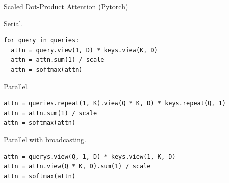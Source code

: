 \documentclass{beamer}
\begin{document}
\begin{frame}[fragile]{Scaled Dot-Product Attention (Pytorch)}

Serial.

\begin{verbatim}
for query in queries:
  attn = query.view(1, D) * keys.view(K, D)
  attn = attn.sum(1) / scale
  attn = softmax(attn)
\end{verbatim}

Parallel.

\begin{verbatim}
attn = queries.repeat(1, K).view(Q * K, D) * keys.repeat(Q, 1)
attn = attn.sum(1) / scale
attn = softmax(attn)
\end{verbatim}

Parallel with broadcasting.

\begin{verbatim}
attn = querys.view(Q, 1, D) * keys.view(1, K, D)
attn = attn.view(Q * K, D).sum(1) / scale
attn = softmax(attn)
\end{verbatim}
\end{frame}
%
\end{document}

